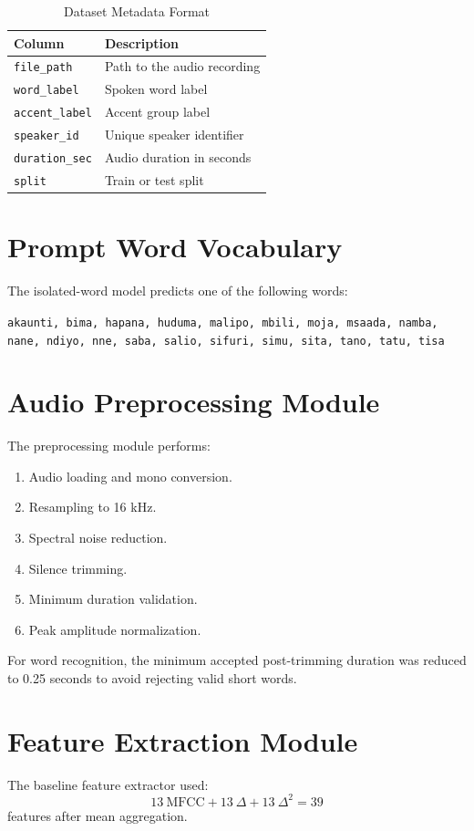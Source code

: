 \documentclass[12pt,a4paper]{report}
\begin{document}
\begin{table}[H]
\centering
\caption{Dataset Metadata Format}
\begin{tabular}{p{4cm}p{9cm}}
\toprule
\textbf{Column} & \textbf{Description}\\
\midrule
\texttt{file\_path} & Path to the audio recording\\
\texttt{word\_label} & Spoken word label\\
\texttt{accent\_label} & Accent group label\\
\texttt{speaker\_id} & Unique speaker identifier\\
\texttt{duration\_sec} & Audio duration in seconds\\
\texttt{split} & Train or test split\\
\bottomrule
\end{tabular}
\end{table}

\section{Prompt Word Vocabulary}
The isolated-word model predicts one of the following words:
\begin{center}
\texttt{akaunti, bima, hapana, huduma, malipo, mbili, moja, msaada, namba, nane, ndiyo, nne, saba, salio, sifuri, simu, sita, tano, tatu, tisa}
\end{center}

\section{Audio Preprocessing Module}
The preprocessing module performs:
\begin{enumerate}
    \item Audio loading and mono conversion.
    \item Resampling to 16 kHz.
    \item Spectral noise reduction.
    \item Silence trimming.
    \item Minimum duration validation.
    \item Peak amplitude normalization.
\end{enumerate}

For word recognition, the minimum accepted post-trimming duration was reduced to 0.25 seconds to avoid rejecting valid short words.

\section{Feature Extraction Module}
The baseline feature extractor used:
\[
13\ \text{MFCC} + 13\ \Delta + 13\ \Delta^2 = 39
\]
features after mean aggregation.
\end{document}
